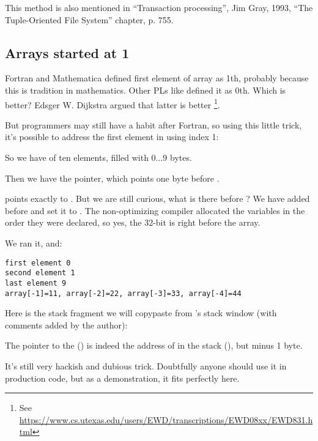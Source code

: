 This method is also mentioned in ``Transaction processing'', Jim Gray, 1993,
``The Tuple-Oriented File System'' chapter, p. 755.

\subsection{Arrays started at 1}
\label{arrays_at_one}

Fortran and Mathematica defined first element of array as 1th, probably because this is tradition in mathematics.
Other \ac{PL}s like \CCpp defined it as 0th.
Which is better?
Edsger W. Dijkstra argued that latter is better
\footnote{See \url{https://www.cs.utexas.edu/users/EWD/transcriptions/EWD08xx/EWD831.html}}.

But programmers may still have a habit after Fortran, so using this little trick, it's possible to address the first element
in \CCpp using index 1:





So we have  of ten elements, filled with $0 \ldots 9$ bytes.

Then we have the  pointer, which points one byte before .

 points exactly to .
But we are still curious, what is there before ?
We have added  before  and set 
it to .
The non-optimizing compiler allocated the variables in the order they were declared, so yes, the 32-bit 
is right before the array.

We ran it, and:

\begin{lstlisting}
first element 0
second element 1
last element 9
array[-1]=11, array[-2]=22, array[-3]=33, array[-4]=44
\end{lstlisting}

Here is the stack fragment we will copypaste from \olly's stack window (with comments added by the author):



The pointer to the  () is indeed 
the address of  in the stack (), 
but minus 1 byte.

It's still very hackish and dubious trick. Doubtfully anyone should use it in production code,
but as a demonstration, it fits perfectly here.


